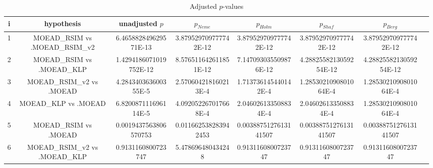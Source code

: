 \documentclass[a4paper,10pt]{article}
\begin{document}
\begin{landscape}
\begin{table}[!htp]
\centering\tiny
\caption{Adjusted $p$-values}
\begin{tabular}{cccccccc}
i&hypothesis&unadjusted $p$&$p_{Neme}$&$p_{Holm}$&$p_{Shaf}$&$p_{Berg}$\\
\hline
1&MOEAD_RSIM vs .MOEAD_RSIM_v2&6.465882849629571E-13&3.879529709777742E-12&3.879529709777742E-12&3.879529709777742E-12&3.879529709777742E-12\\
2&MOEAD_RSIM vs .MOEAD_KLP&1.4294186071019752E-12&8.576511642611851E-12&7.147093035509876E-12&4.2882558213059254E-12&4.2882558213059254E-12\\
3&MOEAD_RSIM_v2 vs .MOEAD&4.284340363600355E-5&2.570604218160213E-4&1.713736145440142E-4&1.2853021090801064E-4&1.2853021090801064E-4\\
4&MOEAD_KLP vs .MOEAD&6.820087111696114E-5&4.092052267017668E-4&2.046026133508834E-4&2.046026133508834E-4&1.2853021090801064E-4\\
5&MOEAD_RSIM vs .MOEAD&0.0019437563806570753&0.011662538283942453&0.0038875127613141507&0.0038875127613141507&0.0038875127613141507\\
6&MOEAD_RSIM_v2 vs .MOEAD_KLP&0.9131160800723747&5.478696480434248&0.9131160800723747&0.9131160800723747&0.9131160800723747\\
\hline
\end{tabular}
\end{table}

\end{landscape}
\end{document}
